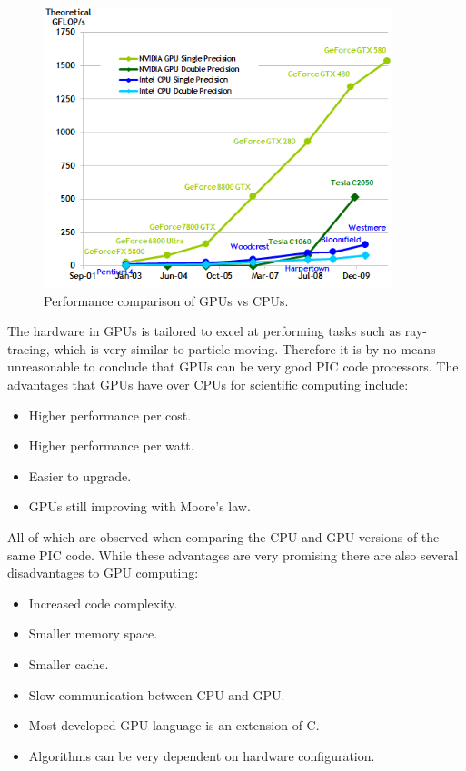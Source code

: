 \begin{figure}
\begin{center}
\includegraphics[width=4in]{introduction/gpu_vs_cpu.png}
\end{center}
\caption{Performance comparison of GPUs vs CPUs.}
\label{fig:gpu_vs_cpu}
\end{figure}

The hardware in GPUs is tailored to excel at performing tasks such as ray-tracing, which is very similar to particle moving. Therefore it is by no means unreasonable to conclude that GPUs can be very good PIC code processors. The advantages that GPUs have over CPUs for scientific computing include:

\begin{itemize}
	\item Higher performance per cost.
	\item Higher performance per watt.
	\item Easier to upgrade.
	\item GPUs still improving with Moore's law.
\end{itemize}

All of which are observed when comparing the CPU and GPU versions of the same PIC code. While these advantages are very promising there are also several disadvantages to GPU computing:

\begin{itemize}
	\item Increased code complexity.
	\item Smaller memory space.
	\item Smaller cache.
	\item Slow communication between CPU and GPU.
	\item Most developed GPU language is an extension of C.
	\item Algorithms can be very dependent on hardware configuration.
\end{itemize}

